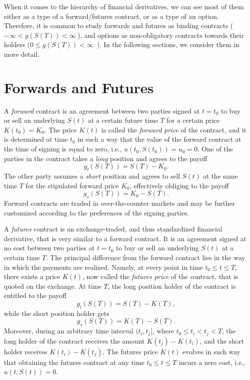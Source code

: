 \documentclass{UUThesisTemplate}
\begin{document}
\par
When it comes to the hierarchy of financial derivatives, we can see most of them either as a type of a forward/futures contract, or as a type of an option. Therefore, it is common to study forwards and futures as binding contracts ($-\infty < g(S(T)) < \infty\ $), and options as non-obligatory contracts towards their holders ($0\leq g(S(T))<\infty$\ ). In the following sections, we consider them in more detail.
%





%
\section{Forwards and Futures}
\label{sec:futures}

\par
A \emph{forward} contract is an agreement between two parties signed at $t=t_0$ to buy or sell an underlying $S(t)$ at a certain future time $T$ for a certain price $K(t_0)=K_0$. The price $K(t)$ is called the \emph{forward price} of the contract, and it is determined at time $t_0$ in such a way that the value of the forward contract at the time of signing is equal to zero, i.e., $u(t_0,S(t_0))=u_0=0$. One of the parties in the contract takes a \emph{long} position and agrees to the payoff 
$$g_l(S(T))=S(T)-K_0.$$
The other party assumes a \emph{short} position and agrees to sell $S(t)$ at the same time $T$ for the stipulated forward price $K_0$, effectively obliging to the payoff 
$$g_s(S(T))=K_0-S(T).$$
Forward contracts are traded in over-the-counter markets and may be further customized according to the preferences of the signing parties.

\par
A \emph{futures} contract is an exchange-traded, and thus standardized financial derivative, that is very similar to a forward contract. It is an agreement signed at no cost between two parties at $t=t_0$ to buy or sell an underlying $S(t)$ at a certain time $T$. The principal difference from the forward contract lies in the way in which the payments are realized. Namely, at every point in time $t_0 \leq t \leq T$, there exists a price $K(t)$, now called the \emph{futures price} of the contract, that is quoted on the exchange. At time $T$, the long position holder of the contract is entitled to the payoff 
$$g_l(S(T))=S(T)-K(T),$$
while the short position holder gets 
$$g_s(S(T))=K(T)-S(T).$$
Moreover, during an arbitrary time interval $(t_i,t_j]$, where $t_0 \leq t_i < t_j < T$, the long holder of the contract receives the amount $K(t_j)-K(t_i)$, and the short holder receives $K(t_i)-K(t_j)$. The futures price $K(t)$ evolves in such way that obtaining the futures contract at any time $t_0 \leq t \leq T$ incurs a zero cost, i.e., $u(t,S(t))=0$. 
\end{document}
